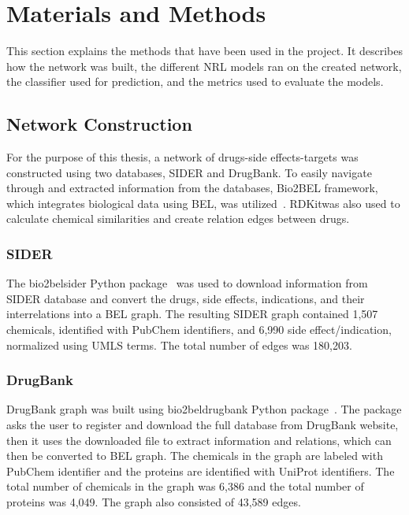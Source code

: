 \chapter{Materials and Methods}
\label{methods}

This section explains the methods that have been used in the project.
It describes how the network was built, the different \ac{NRL} models ran on the created network, the classifier used for prediction, and the metrics used to evaluate the models.

\section{Network Construction}

For the purpose of this thesis, a network of drugs-side effects-targets was constructed using two databases, \ac{SIDER} and DrugBank.
To easily navigate through and extracted information from the databases, Bio2BEL framework, which integrates biological data using \ac{BEL}, was utilized~\cite{hoyt_integration_2019}.
RDKit\footnotemark was also used to calculate chemical similarities and create relation edges between drugs.

\subsection{SIDER}
The bio2bel\textunderscore sider Python package~\cite{charles_tapley_hoyt_bio2bel/sider_2018} was used to download information from \ac{SIDER} database and convert the drugs, side effects, indications, and their interrelations into a \ac{BEL} graph.
The resulting \ac{SIDER} graph contained 1,507 chemicals, identified with PubChem identifiers, and 6,990 side effect/indication, normalized using \ac{UMLS} terms.
The total number of edges was 180,203.

\subsection{DrugBank}

DrugBank graph was built using bio2bel\textunderscore drugbank Python package~\cite{charles_tapley_hoyt_bio2bel/drugbank_2018}.
The package asks the user to register and download the full database from DrugBank website, then it uses the downloaded file to extract information and relations, which can then be converted to \ac{BEL} graph.
The chemicals in the graph are labeled with PubChem identifier and the proteins are identified with UniProt identifiers.
The total number of chemicals in the graph was 6,386 and the total number of proteins was 4,049.
The graph also consisted of 43,589 edges.

